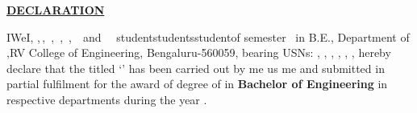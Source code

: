 
\thispagestyle{empty}
\vspace{-0.75cm}
\begin{center}
	\Large\textbf{\underline{DECLARATION}} \par
\end{center}


\noindent \ifPG I\else \ifStuNameBUsed We\else I\fi\fi, \textbf{\printStuNameA}\ifPG ,$\,$\else\ifStuNameBUsed\ifStuNameCUsed,$\,$ \fi \textbf{\printStuNameB}\ifStuNameCUsed \ifStuNameDUsed,$\,$ \fi \textbf{\printStuNameC}\ifStuNameDUsed\ifIDP,$\,$ \fi  \textbf{\printStuNameD}\ifIDP\ifStuNameEUsed\ifStuNameFUsed,$\,$ \fi \textbf{\printStuNameE}$\,$ \ifStuNameFUsed and $\,$ \textbf{\printStuNameF}$\,$ \fi\fi\fi\fi\fi\fi\fi \ifPG student\space \else \ifStuNameBUsed\space students\space\else\space student\space\fi\fi of \ifPG {} \fi\else{}\else{}\else {}\fi\fi\fi\fi\space semester \ifPG \printMastersInSF\, in \printMastersPrgName \else B.E.\fi, \ifIDP \else Department of \printDepartmentLF,\fi\space RV College of Engineering, Bengaluru-560059, bearing USN\ifStuNameBUsed s\fi: \textbf{\printStuUSNA}\ifPG \else\ifStuNameBUsed , \textbf{\printStuUSNB}\fi\ifStuNameCUsed , \textbf{\printStuUSNC}\fi\ifStuNameDUsed , \textbf{\printStuUSND}\fi\ifIDP\ifStuNameEUsed , \textbf{\printStuUSNE}\fi\ifStuNameFUsed , \textbf{\printStuUSNF}\fi\fi\fi, hereby declare that the  \else {} \else {}\fi\fi\fi titled `\textbf{\printTitle}' has been carried out by \ifPG me \else \ifStuNameBUsed us \else me \fi\fi and submitted in partial fulfilment for the award of degree of \ifPG \textbf{\printMastersInLF} in \textbf{\printMastersPrgName} \else\textbf{Bachelor of Engineering} in \ifIDP respective departments \else  \textbf{\printDepartmentLF} \fi\fi during the year \printAcadYear.\\ \par

